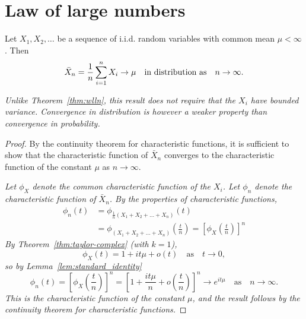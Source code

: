 \section{Law of large numbers}
\begin{theorem}
Let $X_1,X_2,\ldots$ be a sequence of i.i.d. random variables with common mean $\mu<\infty$. Then %
\[
\bar{X}_n = \frac{1}{n}\sum_{i=1}^nX_i \to \mu \text{\quad in distribution as\quad} n\to\infty.
\]
\end{theorem}

\bit
\it Unlike Theorem~\ref{thm:wlln}, this result does not require that the $X_i$ have bounded variance.
\it Convergence in distribution is however a weaker property than convergence in probability.
\eit

\begin{proof}
By the continuity theorem for characteristic functions, it is sufficient to show that the characteristic function of $\bar{X}_n$ converges to the characteristic function of the constant $\mu$ as $n\to\infty$. 

\bit
\it Let $\phi_X$ denote the common characteristic function of the $X_i$.
\it Let $\phi_n$ denote the characteristic function of $\bar{X}_n$.
\eit
By the properties of characteristic functions,
\begin{align*}
\phi_n(t) 
	& = \phi_{\frac{1}{n}(X_1+X_2+\ldots+X_n)}(t) \\
	& = \phi_{(X_1+X_2+\ldots+X_n)}\left(\frac{t}{n}\right)
	= \left[\phi_X\left(\frac{t}{n}\right)\right]^n
\end{align*}
By Theorem~\ref{thm:taylor-complex} (with $k=1$), 
\[
\phi_X(t) = 1 + it\mu + o(t)\quad\text{as}\quad t\to 0,
\]
so by Lemma~\ref{lem:standard_identity}
\[
\phi_n(t) 
	= \left[\phi_X\left(\frac{t}{n}\right)\right]^n
	= \left[1 + \frac{it\mu}{n} + o\left(\frac{t}{n}\right)\right]^n
	\to e^{it\mu} \quad\text{as}\quad n\to\infty.
\]
This is the characteristic function of the constant $\mu$, and the result follows by the continuity theorem for characteristic functions.
\end{proof}

